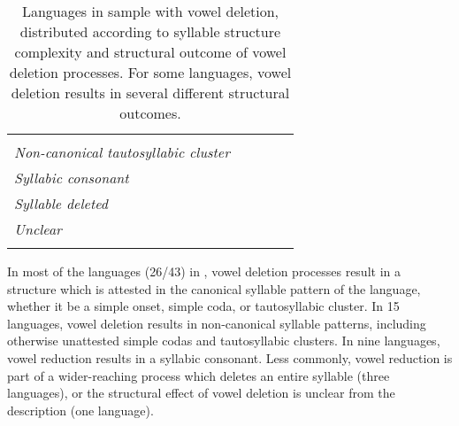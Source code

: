 \begin{table}
\begin{tabularx}{\textwidth}{QQQQQ}
 & 

 & \\
\textit{Non-canonical tautosyllabic cluster} & 

 & 


 &  & 


\\
\textit{Syllabic consonant} &  & 


 & 

 & 


\\
\textit{Syllable deleted} &  &  &  & \\
\textit{Unclear} &  &  &  & \\
\lspbottomrule
\end{tabularx}
\caption{\label{tab:6.9}Languages in sample with vowel deletion, distributed according to syllable structure complexity and structural outcome of vowel deletion processes. For some languages, vowel deletion results in several different structural outcomes.}
\end{table}

  In most of the languages (26/43) in , vowel deletion processes result in a structure which is attested in the canonical syllable pattern of the language, whether it be a simple onset, simple coda, or tautosyllabic cluster. In 15 languages, vowel deletion results in non-canonical syllable patterns, including otherwise unattested simple codas and tautosyllabic clusters. In nine languages, vowel reduction results in a syllabic consonant. Less commonly, vowel reduction is part of a wider-reaching process which deletes an entire syllable (three languages), or the structural effect of vowel deletion is unclear from the description (one language).

